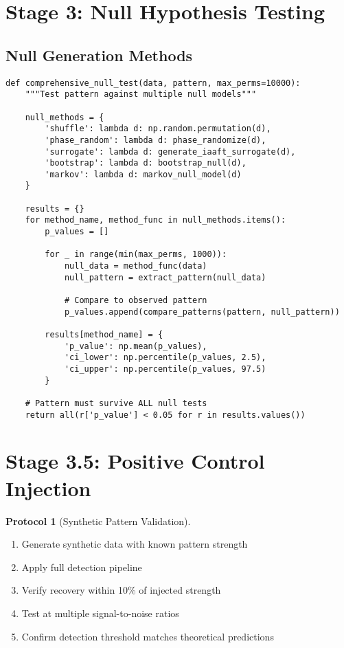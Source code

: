 \documentclass[12pt,oneside]{memoir}
\theoremstyle{plain}
\theoremstyle{definition}
\newtheorem{protocol}[theorem]{Protocol}
\theoremstyle{remark}
\begin{document}
\section{Stage 3: Null Hypothesis Testing}

\subsection{Null Generation Methods}

\begin{lstlisting}[caption={Comprehensive Null Testing Suite}]
def comprehensive_null_test(data, pattern, max_perms=10000):
    """Test pattern against multiple null models"""
    
    null_methods = {
        'shuffle': lambda d: np.random.permutation(d),
        'phase_random': lambda d: phase_randomize(d),
        'surrogate': lambda d: generate_iaaft_surrogate(d),
        'bootstrap': lambda d: bootstrap_null(d),
        'markov': lambda d: markov_null_model(d)
    }
    
    results = {}
    for method_name, method_func in null_methods.items():
        p_values = []
        
        for _ in range(min(max_perms, 1000)):
            null_data = method_func(data)
            null_pattern = extract_pattern(null_data)
            
            # Compare to observed pattern
            p_values.append(compare_patterns(pattern, null_pattern))
        
        results[method_name] = {
            'p_value': np.mean(p_values),
            'ci_lower': np.percentile(p_values, 2.5),
            'ci_upper': np.percentile(p_values, 97.5)
        }
    
    # Pattern must survive ALL null tests
    return all(r['p_value'] < 0.05 for r in results.values())
\end{lstlisting}

\section{Stage 3.5: Positive Control Injection}

\begin{protocol}[Synthetic Pattern Validation]
\begin{enumerate}
\item Generate synthetic data with known pattern strength
\item Apply full detection pipeline
\item Verify recovery within 10\% of injected strength
\item Test at multiple signal-to-noise ratios
\item Confirm detection threshold matches theoretical predictions
\end{enumerate}
\end{protocol}
\end{document}
